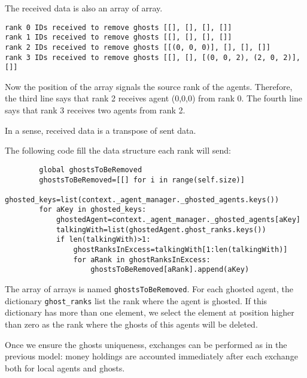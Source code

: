 \documentclass{article}
\begin{document}
The received data is also an array of array.
\begin{verbatim}
rank 0 IDs received to remove ghosts [[], [], [], []]
rank 1 IDs received to remove ghosts [[], [], [], []]
rank 2 IDs received to remove ghosts [[(0, 0, 0)], [], [], []]
rank 3 IDs received to remove ghosts [[], [], [(0, 0, 2), (2, 0, 2)], []]
\end{verbatim}
Now the position of the array signals the source rank of the agents. Therefore, the third line says that rank 2 receives agent (0,0,0) from rank 0. The fourth line says that rank 3 receives two agents from rank 2.

In a sense, received data is a transpose of sent data.

The following code fill the data structure each rank will send:
\begin{verbatim}
        global ghostsToBeRemoved
        ghostsToBeRemoved=[[] for i in range(self.size)]
        ghosted_keys=list(context._agent_manager._ghosted_agents.keys())
        for aKey in ghosted_keys:
            ghostedAgent=context._agent_manager._ghosted_agents[aKey]
            talkingWith=list(ghostedAgent.ghost_ranks.keys())
            if len(talkingWith)>1:
                ghostRanksInExcess=talkingWith[1:len(talkingWith)]
                for aRank in ghostRanksInExcess:
                    ghostsToBeRemoved[aRank].append(aKey)
\end{verbatim}

The array of arrays is named \verb+ghostsToBeRemoved+. For each ghosted agent, the dictionary \verb+ghost_ranks+ list the rank where the agent is ghosted. If this dictionary has more than one element, we select the element at position higher than zero as the rank where the ghosts of this agents will be deleted.


Once we ensure the ghosts uniqueness, exchanges can be performed as in the previous model: money holdings are accounted
immediately after each exchange both for local agents and ghosts.
\end{document}

